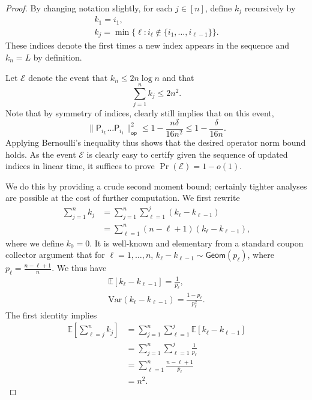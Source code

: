 \documentclass[11pt]{article}
\begin{document}
\begin{proof}
    By changing notation slightly, for each $j\in [n]$, define $k_j$ recursively by
    \begin{gather*}
        k_1 = i_1,\\
        k_{j} = \min\{\ell:i_{\ell}\not\in \{i_1,\ldots,i_{\ell-1}\}\}.
    \end{gather*}
    These indices denote the first times a new index appears in the sequence and $k_n=L$ by definition.

    Let $\mathcal{E}$ denote the event that $k_n\leq 2n \log n$ and that
    \begin{equation*}
        \sum_{j=1}^n k_j\leq 2 n^2.
    \end{equation*}
    Note that by symmetry of indices,  clearly still implies that on this event,
    \begin{equation*}
         \|\mathsf{P}_{i_L}\ldots \mathsf{P}_{i_1}\|_{\mathsf{op}}^2\leq 1-\frac{n\delta}{16n^2}\leq 1-\frac{\delta}{16n}.
    \end{equation*}
    Applying Bernoulli's inequality thus shows that the desired operator norm bound holds. As the event $\mathcal{E}$ is clearly easy to certify given the sequence of updated indices in linear time, it suffices to prove $\Pr(\mathcal{E})=1-o(1)$.

    We do this by providing a crude second moment bound; certainly tighter analyses are possible at the cost of further computation. We first rewrite
    \begin{align*}
        \sum_{j=1}^{n} k_j &= \sum_{j=1}^{n}\sum_{\ell=1}^j (k_{\ell}-k_{\ell-1})\\
        &=\sum_{\ell=1}^n (n-\ell+1)(k_{\ell}-k_{\ell-1}),
    \end{align*}
    where we define $k_0=0$. It is well-known and elementary from a standard coupon collector argument that for $\ell=1,\ldots, n$, $k_{\ell}-k_{\ell-1}\sim \mathsf{Geom}(p_{\ell})$, where $p_{\ell}=\frac{n-\ell+1}{n}$. We thus have
    \begin{gather*}
        \mathbb{E}[k_{\ell}-k_{\ell-1}]=\frac{1}{p_{\ell}},\\
        \mathrm{Var}(k_{\ell}-k_{\ell-1})=\frac{1-p_{\ell}}{p_{\ell}^2}.
    \end{gather*}
    The first identity implies
    \begin{align*}
        \mathbb{E}\left[\sum_{\ell=j}^nk_{j}\right]&=\sum_{j=1}^n\sum_{\ell=1}^j\mathbb{E}[k_{\ell}-k_{\ell-1}]\\
        &=\sum_{j=1}^n\sum_{\ell=1}^j \frac{1}{p_{\ell}}\\
        &=\sum_{\ell=1}^n \frac{n-\ell+1}{p_{\ell}}\\
        &=n^2.
    \end{align*}
    

\end{proof}
\end{document}

